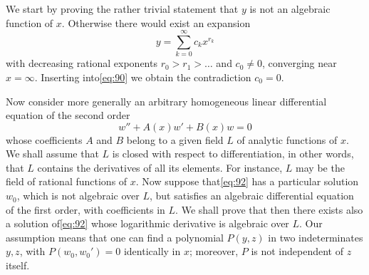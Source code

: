 We start by proving the rather trivial statement that $y$ is not an algebraic function of $x$. Otherwise there would exist an expansion
\[y = \sum_{k=0}^{\infty} c_k x^{r_k}\]
with decreasing rational exponents $r_0 > r_1 > \dots$ and $c_0 \neq 0$, converging near $x=\infty$. Inserting into\eqref{eq:90} we obtain the contradiction $c_0=0$.

Now consider more generally an arbitrary homogeneous linear differential equation of the second order
\begin{equation}
w'' + A(x)w' + B(x)w = 0 \tag{92}\label{eq:92}
\end{equation}
whose coefficients $A$ and $B$ belong to a given field $L$ of analytic functions of $x$. We shall assume that $L$ is closed with respect to differentiation, in other words, that $L$ contains the derivatives of all its elements. For instance, $L$ may be the field of rational functions of $x$. Now suppose that\eqref{eq:92} has a particular solution $w_0$, which is not algebraic over $L$, but satisfies an algebraic differential equation of the first order, with coefficients in $L$. We shall prove that then there exists also a solution of\eqref{eq:92} whose logarithmic derivative is algebraic over $L$. Our assumption means that one can find a polynomial $P(y,z)$ in two indeterminates $y,z$, with $P(w_0, w_0') = 0$ identically in $x$; moreover, $P$ is not independent of $z$ itself.


